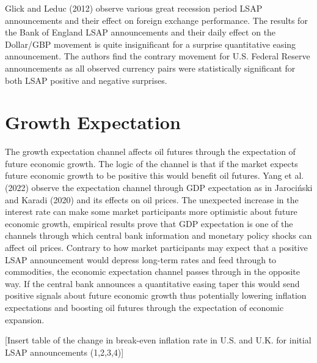 Glick and Leduc (2012) observe various great recession period LSAP announcements and their effect on foreign exchange performance. The results for the Bank of England LSAP announcements and their daily effect on the Dollar/GBP movement is quite insignificant for a surprise quantitative easing announcement. The authors find the contrary movement for U.S. Federal Reserve announcements as all observed currency pairs were statistically significant for both LSAP positive and negative surprises. 

\section{Growth Expectation}
The growth expectation channel affects oil futures through the expectation of future economic growth. The logic of the channel is that if the market expects future economic growth to be positive this would benefit oil futures. Yang et al. (2022) observe the expectation channel through GDP expectation as in Jarociński and Karadi (2020) and its effects on oil prices. The unexpected increase in the interest rate can make some market participants more optimistic about future economic growth, empirical results prove that GDP expectation is one of the channels through which central bank information and monetary policy shocks can affect oil prices. Contrary to how market participants may expect that a positive LSAP announcement would depress long-term rates and feed through to commodities, the economic expectation channel passes through in the opposite way. If the central bank announces a quantitative easing taper this would send positive signals about future economic growth thus potentially lowering inflation expectations and boosting oil futures through the expectation of economic expansion.

[Insert table of the change in break-even inflation rate in U.S. and U.K. for initial LSAP announcements (1,2,3,4)]

